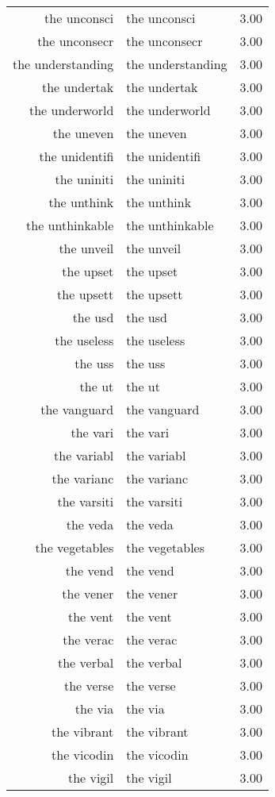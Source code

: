 \begin{table}[ht]
\begin{tabular}{rlr}
  the unconsci & the unconsci & 3.00 \\ 
  the unconsecr & the unconsecr & 3.00 \\ 
  the understanding & the understanding & 3.00 \\ 
  the undertak & the undertak & 3.00 \\ 
  the underworld & the underworld & 3.00 \\ 
  the uneven & the uneven & 3.00 \\ 
  the unidentifi & the unidentifi & 3.00 \\ 
  the uniniti & the uniniti & 3.00 \\ 
  the unthink & the unthink & 3.00 \\ 
  the unthinkable & the unthinkable & 3.00 \\ 
  the unveil & the unveil & 3.00 \\ 
  the upset & the upset & 3.00 \\ 
  the upsett & the upsett & 3.00 \\ 
  the usd & the usd & 3.00 \\ 
  the useless & the useless & 3.00 \\ 
  the uss & the uss & 3.00 \\ 
  the ut & the ut & 3.00 \\ 
  the vanguard & the vanguard & 3.00 \\ 
  the vari & the vari & 3.00 \\ 
  the variabl & the variabl & 3.00 \\ 
  the varianc & the varianc & 3.00 \\ 
  the varsiti & the varsiti & 3.00 \\ 
  the veda & the veda & 3.00 \\ 
  the vegetables & the vegetables & 3.00 \\ 
  the vend & the vend & 3.00 \\ 
  the vener & the vener & 3.00 \\ 
  the vent & the vent & 3.00 \\ 
  the verac & the verac & 3.00 \\ 
  the verbal & the verbal & 3.00 \\ 
  the verse & the verse & 3.00 \\ 
  the via & the via & 3.00 \\ 
  the vibrant & the vibrant & 3.00 \\ 
  the vicodin & the vicodin & 3.00 \\ 
  the vigil & the vigil & 3.00 \\ 

\end{tabular}
\end{table}
